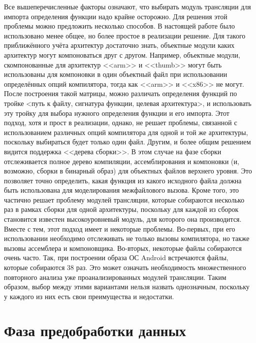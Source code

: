 Все вышеперечисленные факторы означают, что выбирать модуль трансляции для импорта определения функции надо крайне осторожно. Для решения этой проблемы можно предложить несколько способов. В настоящей работе было использовано менее общее, но более простое в реализации решение. Для такого приближённого учёта архитектур достаточно знать, объектные модули каких архитектур могут компоноваться друг с другом. Например, объектные модули, скомпонованные для архитектур <<arm>> и <<thumb>> могут быть использованы для компоновки в один объектный файл при использовании определённых опций компилятора, тогда как <<arm>> и <<x86>> не могут. После построения такой матрицы, можно различать определения функций по тройке <путь к файлу, сигнатура функции, целевая архитектура>, и использовать эту тройку для выбора нужного определения функции и его импорта. Этот подход, хотя и прост в реализации, однако, не решает проблемы, связанной с использованием различных опций компилятора для одной и той же архитектуры, поскольку выбираться будет только один файл. Другим, и более общим решением видится поддержка <<дерева сборки>>. В этом случае на фазе сборки отслеживается полное дерево компиляции, ассемблирования и компоновки (и, возможно, сборки в бинарный образ) для объектных файлов верхнего уровня. Это позволяет точно определить, какая функция из какого исходного файла должна быть использована для моделирования межфайлового вызова. Кроме того, это частично решает проблему модулей трансляции, которые собираются несколько раз в рамках сборки для одной архитектуры, поскольку для каждой из сборок становится известен высокоуровневый модуль, для которого она производится. Вместе с тем, этот подход имеет и некоторые проблемы. Во-первых, при его использовании необходимо отслеживать не только вызовы компилятора, но также вызовы ассемблера и компоновщика. Во-вторых, некоторые файлы собираются очень часто. Так, при построении образа ОС Android встречаются файлы, которые собираются 38 раз. Это может означать необходимость множественного повторного анализа уже проанализированных модулей трансляции. Таким образом, выбор между этими вариантами нельзя назвать однозначным, поскольку у каждого из них есть свои преимущества и недостатки.

\section{Фаза предобработки данных}

